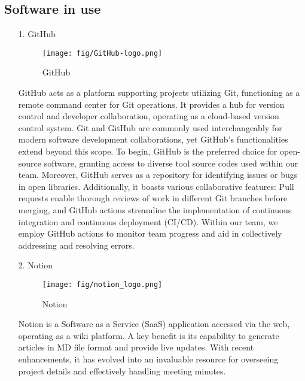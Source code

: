 \documentclass[conference]{IEEEtran}
\begin{document}
\subsection{Software in use}
\begin{enumerate}
    \item[1.]GitHub
    \begin{figure}[h]
    \centering
    \texttt{[image: fig/GitHub-logo.png]}
    \label{fig:GitHub}
    \caption{GitHub} 
    \end{figure}
    \item[]GitHub acts as a platform supporting projects utilizing Git, functioning as a remote command center for Git operations. It provides a hub for version control and developer collaboration, operating as a cloud-based version control system. Git and GitHub are commonly used interchangeably for modern software development collaborations, yet GitHub's functionalities extend beyond this scope. To begin, GitHub is the preferred choice for open-source software, granting access to diverse tool source codes used within our team. Moreover, GitHub serves as a repository for identifying issues or bugs in open libraries. Additionally, it boasts various collaborative features: Pull requests enable thorough reviews of work in different Git branches before merging, and GitHub actions streamline the implementation of continuous integration and continuous deployment (CI/CD). Within our team, we employ GitHub actions to monitor team progress and aid in collectively addressing and resolving errors.\\

    \item[2.]Notion
    \begin{figure}[h]
    \centering
    \texttt{[image: fig/notion\_logo.png]}
    \label{fig:Notion}
    \caption{Notion} 
    \end{figure}
    \item[]Notion is a Software as a Service (SaaS) application accessed via the web, operating as a wiki platform. A key benefit is its capability to generate articles in MD file format and provide live updates. With recent enhancements, it has evolved into an invaluable resource for overseeing project details and effectively handling meeting minutes.\\


\end{enumerate}
\end{document}
